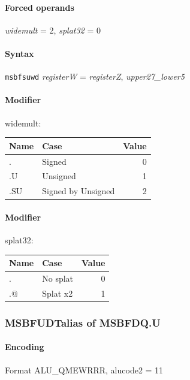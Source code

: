 {\paragraph{Forced operands} \emph{widemult} = 2, \emph{splat32} = 0

\paragraph{Syntax} \texttt{msbfsuwd} \emph{registerW} = \emph{registerZ}, \emph{upper27\_lower5}

\paragraph{Modifier} \textsf{widemult}:\\

\noindent \begin{tabular}{|l|l|r|} \hline
\bf{Name} & \bf{Case} & \bf{Value} \\ \hline
. & Signed & 0 \\
.U & Unsigned & 1 \\
.SU & Signed by Unsigned & 2 \\
\hline \end{tabular}

\paragraph{Modifier} \textsf{splat32}:\\

\noindent \begin{tabular}{|l|l|r|} \hline
\bf{Name} & \bf{Case} & \bf{Value} \\ \hline
. & No splat & 0 \\
.@ & Splat x2 & 1 \\
\hline \end{tabular}
\newpage
\subsubsection[{\small MSBFUDT: alias of MSBFDQ.U}]{MSBFUDT\hfill alias of MSBFDQ.U}
\label{instr:MSBFUDT}

\paragraph{Encoding} Format \textsf{ALU\_QMEWRRR, alucode2 = 11}\\



}
